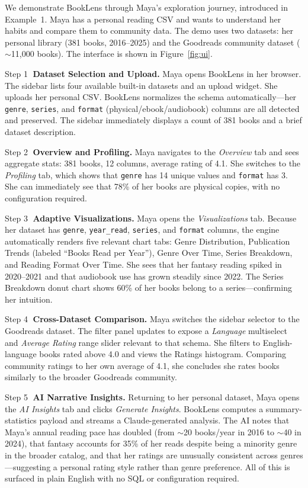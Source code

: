 \documentclass[sigconf]{acmart}
\newcommand{\stepCounter}[1]{{\Large\textcircled{{\small#1}}}}
\begin{document}
We demonstrate BookLens through Maya's exploration journey, introduced in Example~1. Maya has a personal reading CSV and wants to understand her habits and compare them to community data. The demo uses two datasets: her personal library (381 books, 2016--2025) and the Goodreads community dataset ($\sim$11,000 books). The interface is shown in Figure~\ref{fig:ui}.

\smallskip \noindent Step \stepCounter{1} \textbf{Dataset Selection and Upload.} Maya opens BookLens in her browser. The sidebar lists four available built-in datasets and an upload widget. She uploads her personal CSV. BookLens normalizes the schema automatically---her \texttt{genre}, \texttt{series}, and \texttt{format} (physical/ebook/audiobook) columns are all detected and preserved. The sidebar immediately displays a count of 381 books and a brief dataset description.

\smallskip \noindent Step \stepCounter{2} \textbf{Overview and Profiling.} Maya navigates to the \textit{Overview} tab and sees aggregate stats: 381 books, 12 columns, average rating of 4.1. She switches to the \textit{Profiling} tab, which shows that \texttt{genre} has 14 unique values and \texttt{format} has 3. She can immediately see that 78\% of her books are physical copies, with no configuration required.

\smallskip \noindent Step \stepCounter{3} \textbf{Adaptive Visualizations.} Maya opens the \textit{Visualizations} tab. Because her dataset has \texttt{genre}, \texttt{year\_read}, \texttt{series}, and \texttt{format} columns, the engine automatically renders five relevant chart tabs: Genre Distribution, Publication Trends (labeled ``Books Read per Year''), Genre Over Time, Series Breakdown, and Reading Format Over Time. She sees that her fantasy reading spiked in 2020--2021 and that audiobook use has grown steadily since 2022. The Series Breakdown donut chart shows 60\% of her books belong to a series---confirming her intuition.

\smallskip \noindent Step \stepCounter{4} \textbf{Cross-Dataset Comparison.} Maya switches the sidebar selector to the Goodreads dataset. The filter panel updates to expose a \textit{Language} multiselect and \textit{Average Rating} range slider relevant to that schema. She filters to English-language books rated above 4.0 and views the Ratings histogram. Comparing community ratings to her own average of 4.1, she concludes she rates books similarly to the broader Goodreads community.

\smallskip \noindent Step \stepCounter{5} \textbf{AI Narrative Insights.} Returning to her personal dataset, Maya opens the \textit{AI Insights} tab and clicks \textit{Generate Insights}. BookLens computes a summary-statistics payload and streams a Claude-generated analysis. The AI notes that Maya's annual reading pace has doubled (from $\sim$20 books/year in 2016 to $\sim$40 in 2024), that fantasy accounts for 35\% of her reads despite being a minority genre in the broader catalog, and that her ratings are unusually consistent across genres---suggesting a personal rating style rather than genre preference. All of this is surfaced in plain English with no SQL or configuration required.
\end{document}
